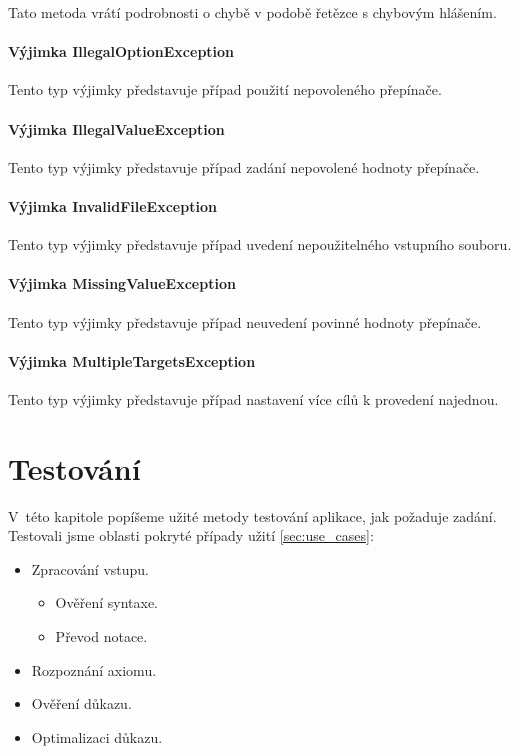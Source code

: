 \documentclass[thesis=B,czech,hidelinks]{thesis}[2012/06/26]
\begin{document}
Tato metoda vrátí podrobnosti o chybě v podobě řetězce s chybovým hlášením.

\subsubsection{Výjimka IllegalOptionException}

Tento typ výjimky představuje případ použití nepovoleného přepínače.

\subsubsection{Výjimka IllegalValueException}

Tento typ výjimky představuje případ zadání nepovolené hodnoty přepínače.

\subsubsection{Výjimka InvalidFileException}

Tento typ výjimky představuje případ uvedení nepoužitelného vstupního souboru.

\subsubsection{Výjimka MissingValueException}

Tento typ výjimky představuje případ neuvedení povinné hodnoty přepínače.

\subsubsection{Výjimka MultipleTargetsException}

Tento typ výjimky představuje případ nastavení více cílů k provedení najednou.

%
%
%

\chapter{Testování}

V~této kapitole popíšeme užité metody testování aplikace, jak požaduje zadání. Testovali jsme oblasti pokryté případy užití \ref{sec:use_cases}:

\begin{itemize}
	\item Zpracování vstupu.
	\begin{itemize}
		\item Ověření syntaxe.
		\item Převod notace.
	\end{itemize}
	\item Rozpoznání axiomu.
	\item Ověření důkazu.
	\item Optimalizaci důkazu.
\end{itemize}
\end{document}
